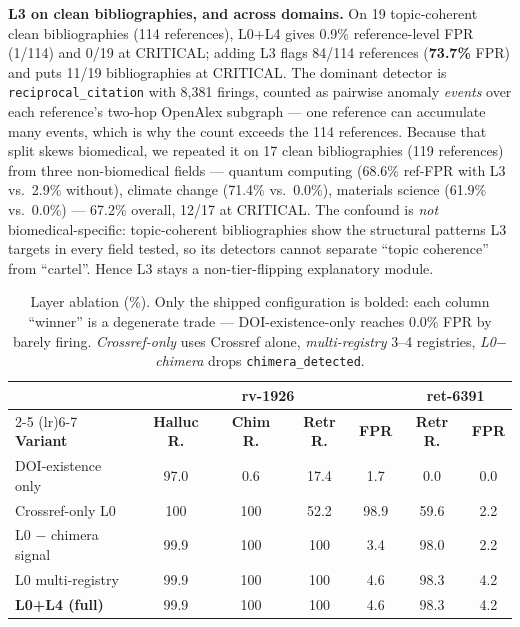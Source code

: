 \documentclass[letterpaper]{article} %
\begin{document}
\noindent\textbf{L3 on clean bibliographies, and across domains.} On 19 topic-coherent clean bibliographies (114 references), L0+L4 gives 0.9\% reference-level FPR (1/114) and 0/19 at CRITICAL; adding L3 flags 84/114 references (\textbf{73.7\%} FPR) and puts 11/19 bibliographies at CRITICAL. The dominant detector is \texttt{reciprocal\_citation} with 8{,}381 firings, counted as pairwise anomaly \emph{events} over each reference's two-hop OpenAlex subgraph --- one reference can accumulate many events, which is why the count exceeds the 114 references. Because that split skews biomedical, we repeated it on 17 clean bibliographies (119 references) from three non-biomedical fields --- quantum computing (68.6\% ref-FPR with L3 vs.\ 2.9\% without), climate change (71.4\% vs.\ 0.0\%), materials science (61.9\% vs.\ 0.0\%) --- 67.2\% overall, 12/17 at CRITICAL. The confound is \emph{not} biomedical-specific: topic-coherent bibliographies show the structural patterns L3 targets in every field tested, so its detectors cannot separate ``topic coherence'' from ``cartel''. Hence L3 stays a non-tier-flipping explanatory module.

\begin{table}[!tb]
\centering
\small
\setlength{\tabcolsep}{4pt}
\begin{tabular}{@{}lcccccc@{}}
\toprule
& \multicolumn{4}{c}{\textbf{rv-1926}} & \multicolumn{2}{c}{\textbf{ret-6391}} \\
\cmidrule(lr){2-5} \cmidrule(lr){6-7}
\textbf{Variant} & \textbf{Halluc R.} & \textbf{Chim R.} & \textbf{Retr R.} & \textbf{FPR}
                 & \textbf{Retr R.} & \textbf{FPR} \\
\midrule
DOI-existence only           & 97.0 & 0.6 & 17.4 & 1.7  & 0.0  & 0.0 \\
Crossref-only L0             & 100  & 100 & 52.2 & 98.9 & 59.6 & 2.2 \\
L0 $-$ chimera signal        & 99.9 & 100 & 100  & 3.4  & 98.0 & 2.2 \\
L0 multi-registry            & 99.9 & 100 & 100  & 4.6  & 98.3 & 4.2 \\
\textbf{L0+L4 (full)}        & 99.9 & 100 & 100  & 4.6  & 98.3 & 4.2 \\
\bottomrule
\end{tabular}
\caption{Layer ablation (\%). Only the shipped configuration is bolded: each column ``winner'' is a degenerate trade --- DOI-existence-only reaches 0.0\% FPR by barely firing. \emph{Crossref-only} uses Crossref alone, \emph{multi-registry} 3--4 registries, \emph{L0$-$chimera} drops \texttt{chimera\_detected}.}
\label{tab:ablation}
\end{table}
\end{document}
